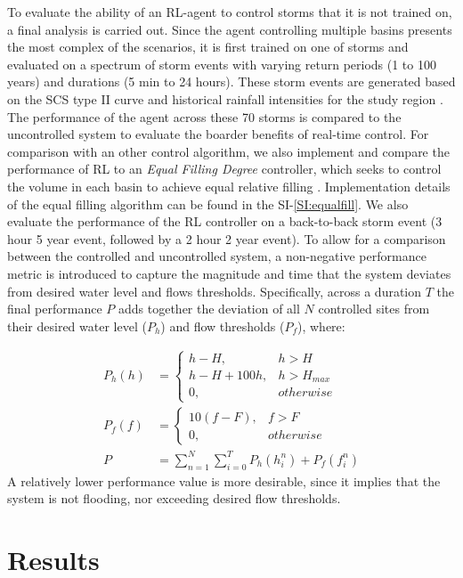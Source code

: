 To evaluate the ability of an RL-agent to control storms that it is not trained on, a final analysis is carried out.
Since the agent controlling multiple basins presents the most complex of the scenarios, it is first trained on one of storms and evaluated on a spectrum of storm events with varying return periods (1 to 100 years) and durations (5 min to 24 hours).
These storm events are generated based on the SCS type II curve and historical rainfall intensities for the study region \cite{scs1986urban}.
The performance of the agent across these 70 storms is compared to the uncontrolled system to evaluate the boarder benefits of real-time control.
For comparison with an other control algorithm, we also implement and compare the performance of RL to an \textit{Equal Filling Degree} controller, which seeks to control the volume in each basin to achieve equal relative filling \cite{schutze_astlingen_2018}. Implementation details of the equal filling algorithm can be found in the SI-\ref{SI:equalfill}.
We also evaluate the performance of the RL controller on a back-to-back storm event (3 hour 5 year event, followed by a 2 hour 2 year event).
To allow for a comparison between the controlled and uncontrolled system, a non-negative performance metric is introduced to capture the magnitude and time that the system deviates from desired water level and flows thresholds.
Specifically, across a duration $T$ the final performance $P$ adds together the deviation of all $N$ controlled sites from their desired water level ($P_h$) and flow thresholds ($P_f$), where:


\begin{align}
	P_h(h) &= \begin{cases}h-H, & h>H \\ h-H+100h,  &h>H_{max} \\0, & otherwise\end{cases} \\
	P_f(f) &= \begin{cases}10(f -F), & f>F \\0, & otherwise\end{cases} \\
	P &= \sum_{n=1}^N \sum_{i=0}^T P_h (h_i^n ) + P_f (f_i^n ) \label{perf_met}
\end{align}
A relatively lower performance value is more desirable, since it implies that the system is not flooding, nor exceeding desired flow thresholds.

\section{Results}

